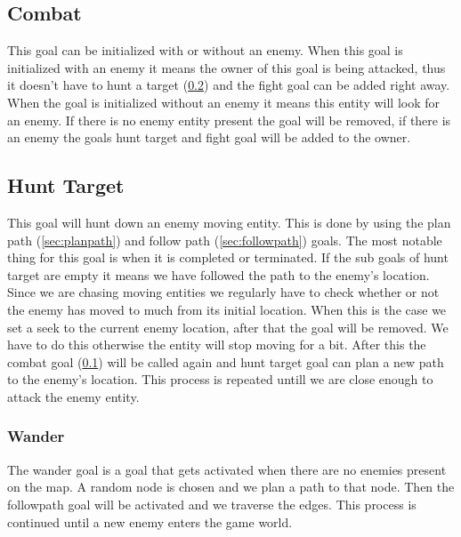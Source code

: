 \subsection{Combat}
\label{sec:combat}
This goal can be initialized with or without an enemy. When this goal is initialized with an enemy it means the owner of this goal is being attacked, thus it doesn’t have to hunt a target (\cref{sec:hunttarget}) and the fight goal can be added right away. When the goal is initialized without an enemy it means this entity will look for an enemy. If there is no enemy entity present the goal will be removed, if there is an enemy the goals hunt target and fight goal will be added to the owner.

\subsection{Hunt Target}
\label{sec:hunttarget}
This goal will hunt down an enemy moving entity. This is done by using the plan path (\cref{sec:planpath}) and follow path (\cref{sec:followpath}) goals. The most notable thing for this goal is when it is completed or terminated. If the sub goals of hunt target are empty it means we have followed the path to the enemy’s location. Since we are chasing moving entities we regularly have to check whether or not the enemy has moved to much from its initial location. When this is the case we set a seek to the current enemy location, after that the goal will be removed. We have to do this otherwise the entity will stop moving for a bit. After this the combat goal (\cref{sec:combat}) will be called again and hunt target goal can plan a new path to the enemy’s location. This process is repeated untill we are close enough to attack the enemy entity.

\subsubsection{Wander}
The wander goal is a goal that gets activated when there are no enemies present on the map. A random node is chosen and we plan a path to that node. Then the followpath goal will be activated and we traverse the edges. This process is continued until a new enemy enters the game world.